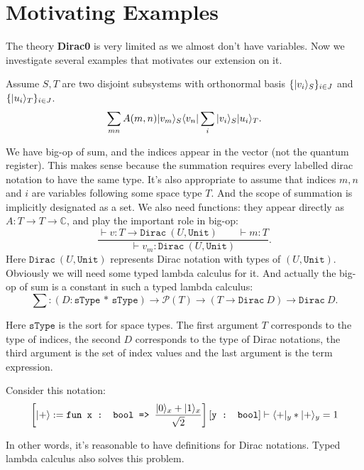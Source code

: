 



\section{Motivating Examples}
The theory \textbf{Dirac0} is very limited as we almost don't have variables. Now we investigate several examples that motivates our extension on it.


\begin{example}
  Assume $S, T$ are two disjoint subsystems with orthonormal basis $\{|v_i\rangle_S\}_{i \in J}$ and $\{|u_i\rangle_T\}_{i \in J}$.
  $$
  \sum_{mn}A(m, n) |v_m\rangle_S\langle v_n| \sum_i |v_i\rangle_S |u_i\rangle_T.
  $$
\end{example}
We have big-op of sum, and the indices appear in the vector (not the quantum register). This makes sense because the summation requires every labelled dirac notation to have the same type. It's also appropriate to assume that indices $m, n$ and $i$ are variables following some space type $T$. And the scope of summation is implicitly designated as a set. We also need functions: they appear directly as $A : T \to T \to \mathbb{C}$, and play the important role in big-op:
$$
\frac{\vdash v : T \to \texttt{Dirac}\ (U, \texttt{Unit}) \qquad \vdash m : T}{\vdash v_m : \texttt{Dirac}\ (U, \texttt{Unit})}.
$$
Here $\texttt{Dirac}\ (U, \texttt{Unit})$ represents Dirac notation with types of $(U, \texttt{Unit})$. Obviously we will need some typed lambda calculus for it. And actually the big-op of sum is a constant in such a typed lambda calculus:
$$
\sum : (D : \texttt{sType * sType}) \to \mathcal{P}(T) \to (T \to \texttt{Dirac}\ D) \to \texttt{Dirac}\ D.
$$

Here $\texttt{sType}$ is the sort for space types. The first argument $T$ corresponds to the type of indices, the second $D$ corresponds to the type of Dirac notations, the third argument is the set of index values and the last argument is the term expression.

\begin{example}
  Consider this notation:
  $$
  \left [|+\rangle := \texttt{fun x : bool => }\frac{|0\rangle_x + |1\rangle_x}{\sqrt{2}} \right ][\texttt{y : bool}] \vdash \langle +|_y * |+\rangle_y = 1
  $$
\end{example}
In other words, it's reasonable to have definitions for Dirac notations. Typed lambda calculus also solves this problem.


